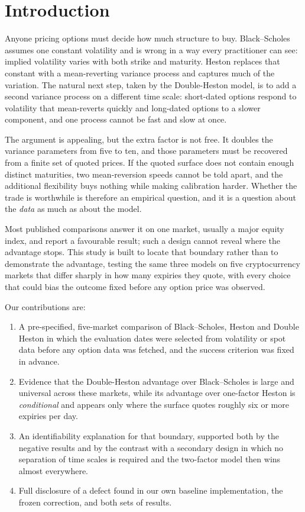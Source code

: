 \documentclass[runningheads]{llncs}
\begin{document}
\section{Introduction}

Anyone pricing options must decide how much structure to buy. Black--Scholes
assumes one constant volatility and is wrong in a way every practitioner can
see: implied volatility varies with both strike and maturity. Heston replaces
that constant with a mean-reverting variance process and captures much of the
variation. The natural next step, taken by the Double-Heston model, is to add
a second variance process on a different time scale: short-dated options
respond to volatility that mean-reverts quickly and long-dated options to a
slower component, and one process cannot be fast and slow at once.

The argument is appealing, but the extra factor is not free. It doubles the
variance parameters from five to ten, and those parameters must be recovered
from a finite set of quoted prices. If the quoted surface does not contain
enough distinct maturities, two mean-reversion speeds cannot be told apart, and
the additional flexibility buys nothing while making calibration harder.
Whether the trade is worthwhile is therefore an empirical question, and it is a
question about the \emph{data} as much as about the model.

Most published comparisons answer it on one market, usually a major equity
index, and report a favourable result; such a design cannot reveal where the
advantage stops. This study is built to locate that boundary rather than to
demonstrate the advantage, testing the same three models on five
cryptocurrency markets that differ sharply in how many expiries they quote,
with every choice that could bias the outcome fixed before any option price
was observed.

Our contributions are:

\begin{enumerate}
\item A pre-specified, five-market comparison of Black--Scholes, Heston and
Double Heston in which the evaluation dates were selected from volatility or
spot data before any option data was fetched, and the success criterion was
fixed in advance.
\item Evidence that the Double-Heston advantage over Black--Scholes is large
and universal across these markets, while its advantage over one-factor Heston
is \emph{conditional} and appears only where the surface quotes roughly six or
more expiries per day.
\item An identifiability explanation for that boundary, supported both by the
negative results and by the contrast with a secondary design in which no
separation of time scales is required and the two-factor model then wins
almost everywhere.
\item Full disclosure of a defect found in our own baseline implementation,
the frozen correction, and both sets of results.
\end{enumerate}
\end{document}
